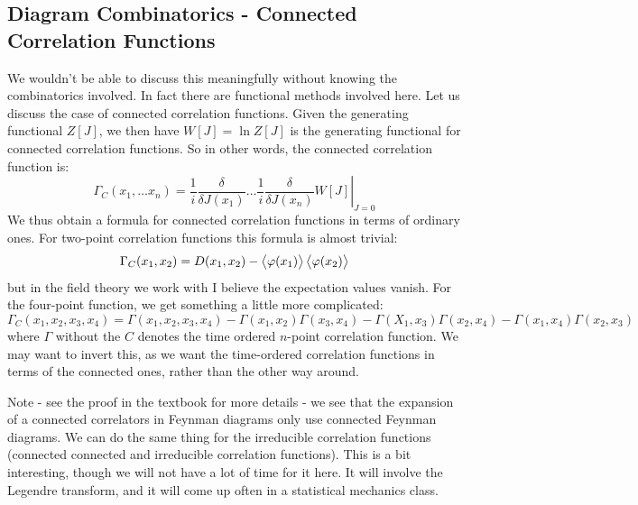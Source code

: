\subsection{Diagram Combinatorics - Connected Correlation Functions}
We wouldn't be able to discuss this meaningfully without knowing the combinatorics involved. In fact there are functional methods involved here. Let us discuss the case of connected correlation functions. Given the generating functional $Z[J]$, we then have $W[J] = \ln Z[J]$ is the generating functional for connected correlation functions. So in other words, the connected correlation function is:
\begin{equation}
    \Gamma_C(x_1, \ldots x_n) = \left.\frac{1}{i}\frac{\delta}{\delta J(x_1)} \ldots \frac{1}{i}\frac{\delta}{\delta J(x_n)}W[J]\right|_{J = 0}
\end{equation}
We thus obtain a formula for connected correlation functions in terms of ordinary ones. For two-point correlation functions this formula is almost trivial:
\begin{equation}
    \Gamma_C(x_1, x_2) = D(x_1, x_2) - \avg{\varphi(x_1)}\avg{\varphi(x_2)}
\end{equation}
but in the field theory we work with I believe the expectation values vanish. For the four-point function, we get something a little more complicated:
\begin{equation}
    \Gamma_C(x_1, x_2, x_3, x_4) = \Gamma(x_1, x_2, x_3, x_4) - \Gamma(x_1, x_2)\Gamma(x_3, x_4) - \Gamma(X_1, x_3)\Gamma(x_2, x_4) - \Gamma(x_1, x_4)\Gamma(x_2, x_3)
\end{equation}
where $\Gamma$ without the $C$ denotes the time ordered $n$-point correlation function. We may want to invert this, as we want the time-ordered correlation functions in terms of the connected ones, rather than the other way around. 

Note - see the proof in the textbook for more details - we see that the expansion of a connected correlators in Feynman diagrams only use connected Feynman diagrams. We can do the same thing for the irreducible correlation functions (connected connected and irreducible correlation functions). This is a bit interesting, though we will not have a lot of time for it here. It will involve the Legendre transform, and it will come up often in a statistical mechanics class.

